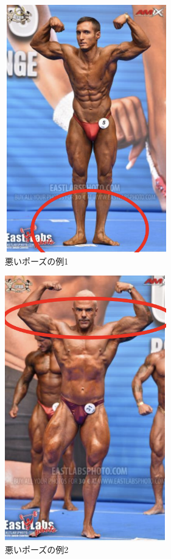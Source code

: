   \begin{figure}[H]
    \begin{center}
        \includegraphics[width=7cm]{figures/badpose1.png}
        \caption{悪いポーズの例1}
        \label{fig:badpose1}
    \end{center}
  \end{figure}
  \begin{figure}[H]
    \begin{center}
        \includegraphics[width=7cm]{figures/badpose2.png}
        \caption{悪いポーズの例2}
        \label{fig:badpose2}
    \end{center}
  \end{figure}
